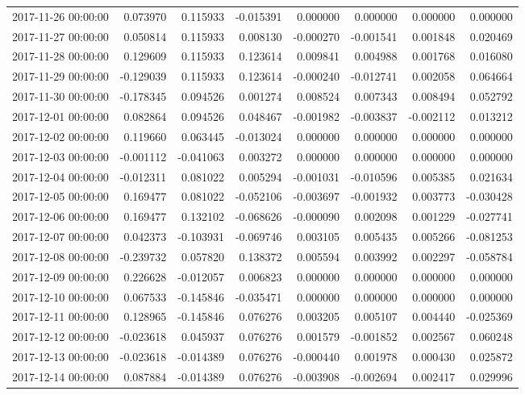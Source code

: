 \begin{tabular}{lrrrrrrr}
2017-11-26 00:00:00 & 0.073970 & 0.115933 & -0.015391 & 0.000000 & 0.000000 & 0.000000 & 0.000000 \\
2017-11-27 00:00:00 & 0.050814 & 0.115933 & 0.008130 & -0.000270 & -0.001541 & 0.001848 & 0.020469 \\
2017-11-28 00:00:00 & 0.129609 & 0.115933 & 0.123614 & 0.009841 & 0.004988 & 0.001768 & 0.016080 \\
2017-11-29 00:00:00 & -0.129039 & 0.115933 & 0.123614 & -0.000240 & -0.012741 & 0.002058 & 0.064664 \\
2017-11-30 00:00:00 & -0.178345 & 0.094526 & 0.001274 & 0.008524 & 0.007343 & 0.008494 & 0.052792 \\
2017-12-01 00:00:00 & 0.082864 & 0.094526 & 0.048467 & -0.001982 & -0.003837 & -0.002112 & 0.013212 \\
2017-12-02 00:00:00 & 0.119660 & 0.063445 & -0.013024 & 0.000000 & 0.000000 & 0.000000 & 0.000000 \\
2017-12-03 00:00:00 & -0.001112 & -0.041063 & 0.003272 & 0.000000 & 0.000000 & 0.000000 & 0.000000 \\
2017-12-04 00:00:00 & -0.012311 & 0.081022 & 0.005294 & -0.001031 & -0.010596 & 0.005385 & 0.021634 \\
2017-12-05 00:00:00 & 0.169477 & 0.081022 & -0.052106 & -0.003697 & -0.001932 & 0.003773 & -0.030428 \\
2017-12-06 00:00:00 & 0.169477 & 0.132102 & -0.068626 & -0.000090 & 0.002098 & 0.001229 & -0.027741 \\
2017-12-07 00:00:00 & 0.042373 & -0.103931 & -0.069746 & 0.003105 & 0.005435 & 0.005266 & -0.081253 \\
2017-12-08 00:00:00 & -0.239732 & 0.057820 & 0.138372 & 0.005594 & 0.003992 & 0.002297 & -0.058784 \\
2017-12-09 00:00:00 & 0.226628 & -0.012057 & 0.006823 & 0.000000 & 0.000000 & 0.000000 & 0.000000 \\
2017-12-10 00:00:00 & 0.067533 & -0.145846 & -0.035471 & 0.000000 & 0.000000 & 0.000000 & 0.000000 \\
2017-12-11 00:00:00 & 0.128965 & -0.145846 & 0.076276 & 0.003205 & 0.005107 & 0.004440 & -0.025369 \\
2017-12-12 00:00:00 & -0.023618 & 0.045937 & 0.076276 & 0.001579 & -0.001852 & 0.002567 & 0.060248 \\
2017-12-13 00:00:00 & -0.023618 & -0.014389 & 0.076276 & -0.000440 & 0.001978 & 0.000430 & 0.025872 \\
2017-12-14 00:00:00 & 0.087884 & -0.014389 & 0.076276 & -0.003908 & -0.002694 & 0.002417 & 0.029996 \\

\end{tabular}
